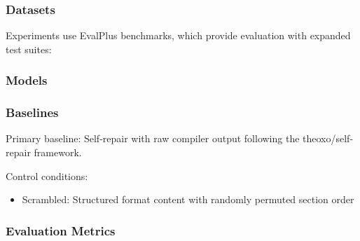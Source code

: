 
\subsubsection{Datasets}

Experiments use EvalPlus benchmarks, which provide evaluation with expanded test suites:

\begin{table}[htbp]
\centering
{}
\end{table}

\subsubsection{Models}

\begin{table}[htbp]
\centering
{}
\end{table}

\subsubsection{Baselines}

Primary baseline: Self-repair with raw compiler output following the theoxo/self-repair framework.

Control conditions:
\begin{itemize}
\item Scrambled: Structured format content with randomly permuted section order
\end{itemize}

\subsubsection{Evaluation Metrics}

